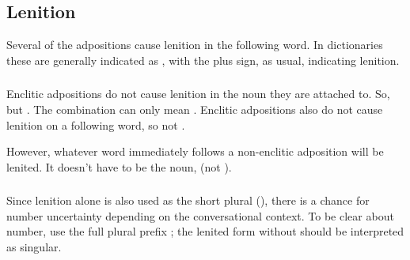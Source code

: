 \subsection{Lenition} Several of the adpositions
cause lenition in the following word.  In dictionaries these are
generally indicated as , with the plus sign, as usual,
indicating lenition.

\subsubsection{} Enclitic adpositions do not cause lenition in the
noun they are attached to.  So,   but
.  The combination  can only mean .  Enclitic adpositions also do not cause lenition on a
following word, so  
not .

However, whatever word immediately follows a non-enclitic adposition
will be lenited.  It doesn't have to be the noun, 
 (not ).

\subsubsection{} Since lenition alone is also used as the short plural
(), there is a chance for number
uncertainty depending on the conversational context.  To be clear
about number, use the full plural prefix ; the lenited form
without  should be interpreted as singular.
\label{syn:adp:short-plural}


